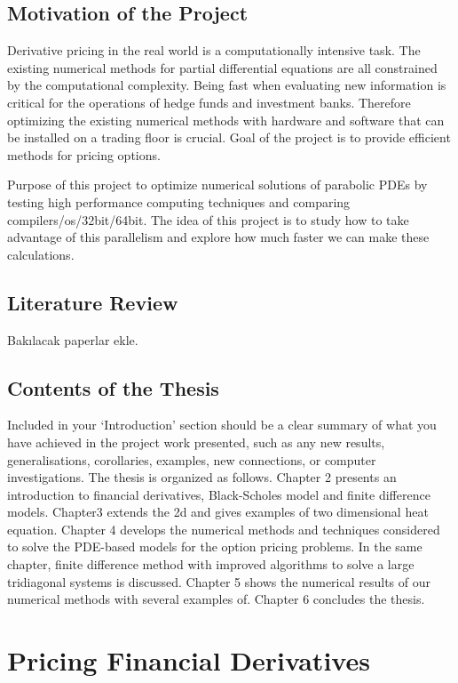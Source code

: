 \documentclass[12pt, oneside]{book}
\theoremstyle{plain}
\theoremstyle{definition}
\begin{document}
\section{Motivation of the Project}
Derivative pricing in the real world is a computationally intensive task. The existing numerical methods for partial differential equations are all constrained by the computational complexity. Being fast when evaluating new information is critical for the operations of hedge funds and investment banks. Therefore optimizing the existing numerical methods with hardware and software that can be installed on a trading floor is crucial. Goal of the project is to provide efficient methods for pricing options.

Purpose of this project to optimize numerical solutions of parabolic PDEs by testing high performance computing techniques and comparing compilers/os/32bit/64bit.
The idea of this project is to study how to take advantage of this parallelism and explore how much faster we can make these calculations.

\section{Literature Review}
Bakılacak paperlar ekle.

\section{Contents of the Thesis}
Included in your ‘Introduction’ section should be a clear summary of  what  you  have  achieved  in  the  project  work  presented,  such  as  any  new  results, generalisations, corollaries, examples, new connections, or computer investigations.  The thesis is organized as follows.  Chapter 2 presents an introduction to financial derivatives, Black-Scholes model and finite difference models.  Chapter3 extends the 2d and gives examples of two dimensional heat equation.  Chapter 4 develops the numerical methods and techniques considered to solve the PDE-based models for the option pricing problems.  In the same chapter,  finite difference method with improved algorithms to solve a large tridiagonal systems is discussed.  Chapter 5 shows the numerical results of our numerical methods with several examples of.  Chapter 6 concludes the thesis.

\chapter{Pricing Financial Derivatives}\label{Pricing Financial Derivatives}
\end{document}
